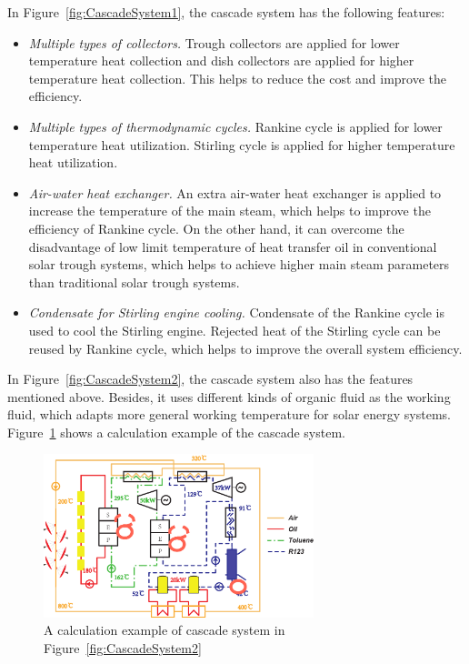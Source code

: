 In Figure~\ref{fig:CascadeSystem1}, the cascade system has the following features:

\begin{itemize}
  \item \emph{Multiple types of collectors.} Trough collectors are applied for lower temperature heat collection and dish collectors are applied for higher temperature heat collection. This helps to reduce the cost and improve the efficiency.
  \item \emph{Multiple types of thermodynamic cycles.} Rankine cycle is applied for lower temperature heat utilization. Stirling cycle is applied for higher temperature heat utilization.
  \item \emph{Air-water heat exchanger.} An extra air-water heat exchanger is applied to increase the temperature of the main steam, which helps to improve the efficiency of Rankine cycle. On the other hand, it can overcome the disadvantage of low limit temperature of heat transfer oil in conventional solar trough systems, which helps to achieve higher main steam parameters than traditional solar trough systems. 
  \item \emph{Condensate for Stirling engine cooling.} Condensate of the Rankine cycle is used to cool the Stirling engine. Rejected heat of the Stirling cycle can be reused by Rankine cycle, which helps to improve the overall system efficiency.
\end{itemize}

In Figure~\ref{fig:CascadeSystem2}, the cascade system also has the features mentioned above. Besides, it uses different kinds of organic fluid as the working fluid, which adapts more general working temperature for solar energy systems. Figure~\ref{fig:Ex_CascadeSystem2} shows a calculation example of the cascade system.

\begin{figure}[!ht]
\centering 
\includegraphics[width=0.7\textwidth]{fig/Ex_CascadeSystem2}
\caption{A calculation example of cascade system in Figure~\ref{fig:CascadeSystem2}}
\label{fig:Ex_CascadeSystem2}
\end{figure}

